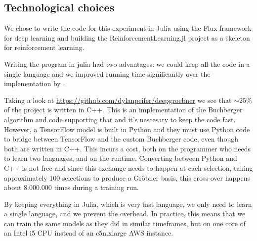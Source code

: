 \documentclass{article}
\theoremstyle{changedot}
\theoremstyle{changedotbreak}
\theoremstyle{nonumberplain}
\begin{document}
\subsection{Technological choices}
We chose to write the code for this experiment in Julia using the Flux framework for deep learning and building the ReinforcementLearning.jl project as a skeleton for reinforcement learning.

Writing the program in julia had two advantages: we could keep all the code in a single language and we improved running time significantly over the implementation by \cite{peifer}.

Taking a look at \url{https://github.com/dylanpeifer/deepgroebner} we see that $\sim 25\%$ of the project is written in C++. This is an implementation of the Buchberger algorithm and code supporting that and it's nescesary to keep the code fast. However, a TensorFlow model is built in Python and they must use Python code to bridge between TensorFlow and the custom Buchberger code, even though both are written in C++. This incurs a cost, both on the programmer who needs to learn two languages, and on the runtime. Converting between Python and C++ is not free and since this exchange needs to happen at each selection, taking approximately 100 selections to produce a Gröbner basis, this cross-over happens about 8.000.000 times during a training run.

By keeping everything in Julia, which is very fast language, we only need to learn a single language, and we prevent the overhead. In practice, this means that we can train the same models as they did in similar timeframes, but on one core of an Intel i5 CPU instead of an c5n.xlarge AWS instance.







\printbibliography
\end{document}

